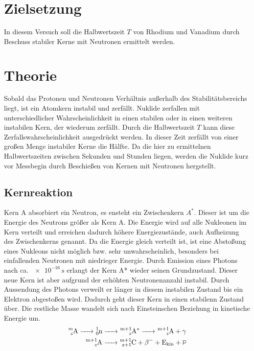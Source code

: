 \section{Zielsetzung}
In diesem Versuch soll die Halbwertszeit $T$ von Rhodium und Vanadium durch Beschuss stabiler Kerne mit Neutronen ermittelt werden.

\section{Theorie}
\label{sec:Theorie}
Sobald das Protonen und Neutronen Verhältnis außerhalb des Stabilitätsbereichs liegt, ist ein Atomkern instabil und zerfällt.
Nuklide zerfallen mit unterschiedlicher Wahrscheinlichkeit in einen stabilen oder in einen weiteren instabilen Kern, der wiederum zerfällt.
Durch die Halbwertszeit $T$ kann diese Zerfallswahrscheinlichkeit ausgedrückt werden.
In dieser Zeit zerfällt von einer großen Menge instabiler Kerne die Hälfte.
Da die hier zu ermittelnen Halbwertszeiten zwischen Sekunden und Stunden liegen, werden die Nuklide kurz vor Messbegin durch Beschießen von Kernen mit Neutronen hergstellt.

\subsection{Kernreaktion}
\label{subsec:Kernreaktion}
Kern A absorbiert ein Neutron, es ensteht ein Zwischenkern $A^*$.
Dieser ist um die Energie des Neutrons größer als Kern A.
Die Energie wird auf alle Nukleonen im Kern verteilt und erreichen dadurch höhere Energiezustände, auch Aufheizung des Zwischenkerns genannt.
Da die Energie gleich verteilt ist, ist eine Abstoßung eines Nukleons nicht möglich bzw. sehr unwahrscheinlich, besonders bei einfallenden Neutronen mit niedrieger Energie.
Durch Emission eines Photons nach ca. $\SI{e-16}{\second}$ erlangt der Kern A* wieder seinen Grundzustand.
Dieser neue Kern ist aber aufgrund der erhöhten Neutronenanzahl instabil.
Durch Aussendung des Photons verweilt er länger in diesem instabilen Zustand bis ein Elektron abgestoßen wird.
Dadurch geht dieser Kern in einen stabilenn Zustand über.
Die restliche Masse wandelt sich nach Einsteinschen Beziehung in kinetische Energie um.
\begin{align*}
    \ce{^{m}_{z}A -> ^{1}_0n -> ^{m{+1}}_{z}{A^{*}} -> ^{m{+1}}_{z}A + \gamma}\\
    \ce{^{m{+1}}_{z}A -> ^{m{+1}}_{z{+1}}C + \beta^{-} + E_{\text{kin}} + \overline{\nu}}
\end{align*}
